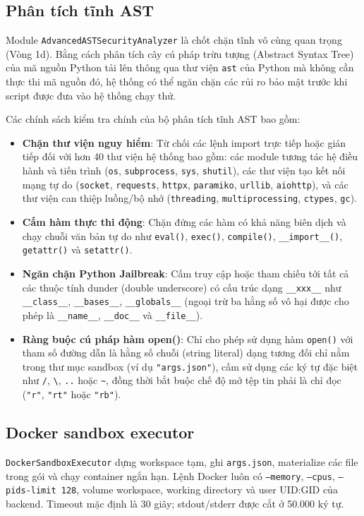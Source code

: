 \documentclass[12pt,a4paper]{article}
\begin{document}
\subsection{Phân tích tĩnh AST}
Module \texttt{AdvancedASTSecurityAnalyzer} là chốt chặn tĩnh vô cùng quan trọng (Vòng 1d). Bằng cách phân tích cây cú pháp trừu tượng (Abstract Syntax Tree) của mã nguồn Python tải lên thông qua thư viện \texttt{ast} của Python mà không cần thực thi mã nguồn đó, hệ thống có thể ngăn chặn các rủi ro bảo mật trước khi script được đưa vào hệ thống chạy thử.

Các chính sách kiểm tra chính của bộ phân tích tĩnh AST bao gồm:
\begin{itemize}
    \item \textbf{Chặn thư viện nguy hiểm}: Từ chối các lệnh import trực tiếp hoặc gián tiếp đối với hơn 40 thư viện hệ thống bao gồm: các module tương tác hệ điều hành và tiến trình (\texttt{os}, \texttt{subprocess}, \texttt{sys}, \texttt{shutil}), các thư viện tạo kết nối mạng tự do (\texttt{socket}, \texttt{requests}, \texttt{httpx}, \texttt{paramiko}, \texttt{urllib}, \texttt{aiohttp}), và các thư viện can thiệp luồng/bộ nhớ (\texttt{threading}, \texttt{multiprocessing}, \texttt{ctypes}, \texttt{gc}).
    \item \textbf{Cấm hàm thực thi động}: Chặn đứng các hàm có khả năng biên dịch và chạy chuỗi văn bản tự do như \texttt{eval()}, \texttt{exec()}, \texttt{compile()}, \texttt{\_\_import\_\_()}, \texttt{getattr()} và \texttt{setattr()}.
    \item \textbf{Ngăn chặn Python Jailbreak}: Cấm truy cập hoặc tham chiếu tới tất cả các thuộc tính dunder (double underscore) có cấu trúc dạng \texttt{\_\_xxx\_\_} như \texttt{\_\_class\_\_}, \texttt{\_\_bases\_\_}, \texttt{\_\_globals\_\_} (ngoại trừ ba hằng số vô hại được cho phép là \texttt{\_\_name\_\_}, \texttt{\_\_doc\_\_} và \texttt{\_\_file\_\_}).
    \item \textbf{Ràng buộc cú pháp hàm open()}: Chỉ cho phép sử dụng hàm \texttt{open()} với tham số đường dẫn là hằng số chuỗi (string literal) dạng tương đối chỉ nằm trong thư mục sandbox (ví dụ \texttt{"args.json"}), cấm sử dụng các ký tự đặc biệt như \texttt{/}, \texttt{\textbackslash}, \texttt{..} hoặc \texttt{\~}, đồng thời bắt buộc chế độ mở tệp tin phải là chỉ đọc (\texttt{"r"}, \texttt{"rt"} hoặc \texttt{"rb"}).
\end{itemize}

\subsection{Docker sandbox executor}
\texttt{DockerSandboxExecutor} dựng workspace tạm, ghi \texttt{args.json}, materialize các file trong gói và chạy container ngắn hạn. Lệnh Docker luôn có \texttt{--memory}, \texttt{--cpus}, \texttt{--pids-limit 128}, volume workspace, working directory và user UID:GID của backend. Timeout mặc định là 30 giây; stdout/stderr được cắt ở 50.000 ký tự.
\end{document}
